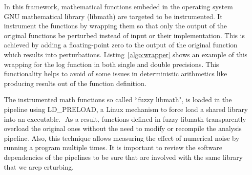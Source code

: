 \documentclass[conference]{IEEEtran}
\begin{document}
In this framework, mathematical functions embeded in the operating system GNU mathematical library (libmath)
are targeted to be instrumented.
It instrument the functions by wrapping them so that only the output of the original functions be perturbed
instead of input or their implementation.
This is achieved by adding a floating-point zero to the output of the original function which results into perturbations.
Listing~\ref{algo:wrapper} shows an example of this wrapping for the log function in both single and double precisions.
This functionality helps to avoid of some issues in deterministic arithmetics like producing results out of the function definition.




The instrumented math functions so called ``fuzzy libmath", is loaded in the pipeline using LD\_PRELOAD, a Linux mechanism
to force load a shared library into an executable. ​
As a result, functions defined in fuzzy libmath transparently overload the original ones without the need to modify or
recompile the analysis pipeline.​
Also, this technique allows measuring the effect of numerical noise by running a program multiple times.​
It is important to review the software dependencies of the pipelines to be sure that are involved with the same library that
we arep erturbing.

\end{document}
